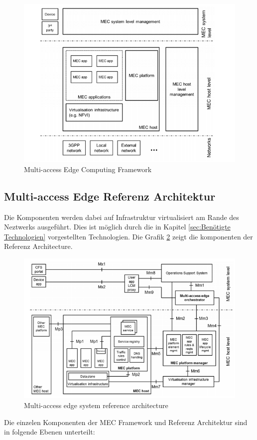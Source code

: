 \documentclass[runningheads]{llncs}
\numberwithin{figure}{section}
\begin{document}
\begin{figure}
  \includegraphics[width=\linewidth]{images/MecFramework.png}
  \caption{Multi-access Edge Computing Framework}
  \label{fig:MecFramework}
\end{figure}

\subsection{Multi-access Edge Referenz Architektur}
Die Komponenten werden dabei auf Infrastruktur virtualisiert am Rande des Neztwerks ausgeführt. 
Dies ist möglich durch die in Kapitel \ref{sec:Benötigte Technologien} vorgestellten Technologien.
Die Grafik \ref{fig:mecarchitecture} zeigt die komponenten der Referenz Architecture.
\begin{figure}
  \includegraphics[width=\linewidth]{images/mecarchitecture.png}
  \caption{Multi-access edge system reference architecture }
  \label{fig:mecarchitecture}
\end{figure}
Die einzelen Komponenten der MEC Framework und Referenz Architektur sind in folgende Ebenen unterteilt:
\end{document}
